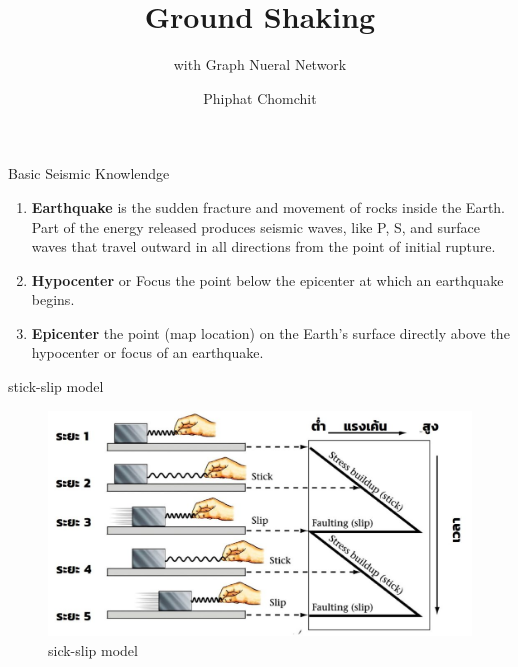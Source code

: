 \documentclass{beamer}
\title{Ground Shaking}
\subtitle{with Graph Nueral Network}
\author{Phiphat Chomchit}
\institute{Chiang Mai University}
\newcounter{saveenumi}
\newcommand{\seti}{\setcounter{saveenumi}{\value{enumi}}}
\begin{document}

	\begin{frame}
		\titlepage
	\end{frame}

	\begin{frame}[t]{Basic Seismic Knowlendge}

		\begin{enumerate}
			\item \textbf{Earthquake} is the sudden fracture and movement of rocks inside the Earth. 
			Part of the energy released produces seismic waves, like P, S, and surface waves that 
			travel outward in all directions from the point of initial rupture.
			\item \textbf{Hypocenter} or Focus the point below the epicenter at which an earthquake
			begins.
			\item \textbf{Epicenter} the point (map location) on the Earth’s surface directly above 
			the hypocenter or focus of an earthquake.
			\seti
		\end{enumerate}
		
	\end{frame}

	\begin{frame}[t]{stick-slip model}
		\begin{figure}
			\centering
			\includegraphics[scale=0.5]{stick.jpg}
			\caption{sick-slip model}
		\end{figure}
	\end{frame}
\end{document}
